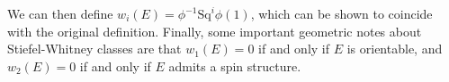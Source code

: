 \documentclass[12pt]{book}
\theoremstyle{definition}
\theoremstyle{remark}
\newcommand{\Sq}{\mathrm{Sq}}
\begin{document}
We can then define $w_{i}(E) = \phi^{-1}\Sq^{i}\phi(1)$, which can be shown to coincide with the original definition. Finally, some important geometric notes about Stiefel-Whitney classes are that $w_{1}(E) = 0$ if and only if $E$ is orientable, and $w_{2}(E) = 0$ if and only if $E$ admits a spin structure.
\end{document}
